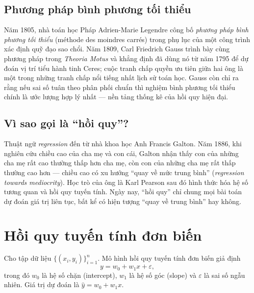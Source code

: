 \subsection{Phương pháp bình phương tối thiểu}

Năm 1805, nhà toán học Pháp Adrien-Marie Legendre công bố \textit{phương pháp bình phương tối thiểu} (méthode des moindres carrés) trong phụ lục của một công trình xác định quỹ đạo sao chổi. Năm 1809, Carl Friedrich Gauss trình bày cùng phương pháp trong \textit{Theoria Motus} và khẳng định đã dùng nó từ năm 1795 để dự đoán vị trí tiểu hành tinh Ceres; cuộc tranh chấp quyền ưu tiên giữa hai ông là một trong những tranh chấp nổi tiếng nhất lịch sử toán học. Gauss còn chỉ ra rằng nếu sai số tuân theo phân phối chuẩn thì nghiệm bình phương tối thiểu chính là ước lượng hợp lý nhất --- nền tảng thống kê của hồi quy hiện đại.

\subsection{Vì sao gọi là ``hồi quy''?}

Thuật ngữ \textit{regression} đến từ nhà khoa học Anh Francis Galton. Năm 1886, khi nghiên cứu chiều cao của cha mẹ và con cái, Galton nhận thấy con của những cha mẹ rất cao thường thấp hơn cha mẹ, còn con của những cha mẹ rất thấp thường cao hơn --- chiều cao có xu hướng ``quay về mức trung bình'' (\textit{regression towards mediocrity}). Học trò của ông là Karl Pearson sau đó hình thức hóa hệ số tương quan và hồi quy tuyến tính. Ngày nay, ``hồi quy'' chỉ chung mọi bài toán dự đoán giá trị liên tục, bất kể có hiện tượng ``quay về trung bình'' hay không.


\section{Hồi quy tuyến tính đơn biến}

\begin{definition}
Cho tập dữ liệu $\{(x_i, y_i)\}_{i=1}^{n}$. Mô hình hồi quy tuyến tính đơn biến giả định
\begin{equation}
    y = w_0 + w_1 x + \varepsilon,
\end{equation}
trong đó $w_0$ là hệ số chặn (intercept), $w_1$ là hệ số góc (slope) và $\varepsilon$ là sai số ngẫu nhiên. Giá trị dự đoán là $\hat{y} = w_0 + w_1 x$.
\end{definition}

